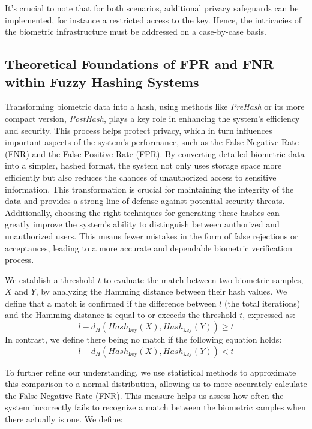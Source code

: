 It's crucial to note that for both scenarios, additional privacy safeguards can be implemented, for instance a restricted access to the key. Hence, the intricacies of the biometric infrastructure must be addressed on a case-by-case basis.

\subsection{Theoretical Foundations of FPR and FNR within Fuzzy Hashing Systems}

Transforming biometric data into a hash, using methods like \textit{PreHash} or its more compact version, \textit{PostHash}, plays a key role in enhancing the system's efficiency and security. This process helps protect privacy, which in turn influences important aspects of the system's performance, such as the \hyperref[def:FNR]{False Negative Rate (FNR)} and the \hyperref[def:FPR]{False Positive Rate (FPR)}. By converting detailed biometric data into a simpler, hashed format, the system not only uses storage space more efficiently but also reduces the chances of unauthorized access to sensitive information. This transformation is crucial for maintaining the integrity of the data and provides a strong line of defense against potential security threats. Additionally, choosing the right techniques for generating these hashes can greatly improve the system's ability to distinguish between authorized and unauthorized users. This means fewer mistakes in the form of false rejections or acceptances, leading to a more accurate and dependable biometric verification process.

We establish a threshold \(t\) to evaluate the match between two biometric samples, \(X\) and \(Y\), by analyzing the Hamming distance between their hash values.
We define that a match is confirmed if the difference between \(l\) (the total iterations) and the Hamming distance is equal to or exceeds the threshold \(t\), expressed as: \[l - d_H(Hash_{\text{key}}(X), Hash_{\text{key}}(Y)) \geq t\]
In contrast, we define there being no match if the following equation holds: \[l - d_H(Hash_{\text{key}}(X), Hash_{\text{key}}(Y)) < t\]

To further refine our understanding, we use statistical methods to approximate this comparison to a normal distribution, allowing us to more accurately calculate the False Negative Rate (FNR). This measure helps us assess how often the system incorrectly fails to recognize a match between the biometric samples when there actually is one. We define:

